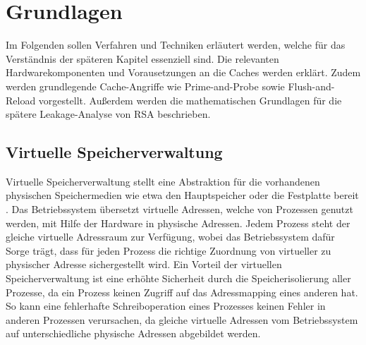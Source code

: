 \chapter{Grundlagen}
\label{chapter:basics}

Im Folgenden sollen Verfahren und Techniken %
erläutert werden, welche für das Verständnis der späteren Kapitel essenziell sind.
Die relevanten Hardwarekomponenten und Vorausetzungen an die Caches werden erklärt.
Zudem werden grundlegende Cache-Angriffe wie Prime-and-Probe sowie Flush-and-Reload vorgestellt.
Außerdem werden die mathematischen Grundlagen für die spätere Leakage-Analyse von RSA beschrieben.

\section{Virtuelle Speicherverwaltung}


Virtuelle Speicherverwaltung stellt eine Abstraktion für die vorhandenen physischen Speichermedien wie etwa den Hauptspeicher oder die Festplatte bereit \cite{tanenbaumVirtualMemory}.
Das Betriebssystem übersetzt virtuelle Adressen, welche von Prozessen genutzt werden, mit Hilfe der Hardware in physische Adressen. 
Jedem Prozess steht der gleiche virtuelle Adressraum zur Verfügung, wobei das Betriebssystem dafür Sorge trägt, dass für jeden Prozess die richtige Zuordnung von virtueller zu physischer Adresse sichergestellt wird.
Ein Vorteil der virtuellen Speicherverwaltung ist eine erhöhte Sicherheit durch die Speicherisolierung aller Prozesse, da ein Prozess keinen Zugriff auf das Adressmapping eines anderen hat.
So kann eine fehlerhafte Schreiboperation eines Prozesses keinen Fehler in anderen Prozessen verursachen, da gleiche virtuelle Adressen vom Betriebssystem auf unterschiedliche physische Adressen abgebildet werden.

